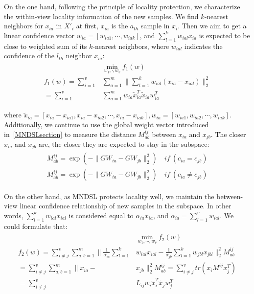 \documentclass[journal]{IEEEtran}
\begin{document}
On the one hand, following the principle of locality protection, we characterize the within-view locality information of the new samples. 
We find $k$-nearest neighbors for $x_{ia}$ in $X'_i$ at first, $x_{ia}$ is the $a_{th}$ sample in $x_i$. 
Then we aim to get a linear confidence vector $w_{ia}=[w_{ia1}, \cdots, w_{iak}]$, and $\sum_{l=1}^k w_{ial} x_{ia}$ is expected to be close to weighted sum of its $k$-nearest neighbors, where $w_{ial}$ indicates the confidence of the $l_{th}$ neighbor $x_{ia}$: 
\begin{align}
\begin{split}
& \min_{w_1,\cdot, w_v} f_1(w) \\
f_1(w)=\sum_{i=1}^v& \sum_{a=1}^m \|\sum_{l=1}^k w_{ial}(x_{ia}-x_{ial}) \|_2^2 \\
=\sum_{i=1}^v& \sum_{a=1}^m w_{ia} \tilde{x}_{ia}^T \tilde{x}_{ia}w_{ia}^T 
\label{f_1}
\end{split}
\end{align}

where $\tilde{x}_{ia}=[x_{ia}-x_{ia1}, x_{ia}-x_{ia2}, \cdots, x_{ia}-x_{iak}], w_{ia}=[w_{ia1}, w_{ia2}, \cdots, w_{iak}]$. 
Additionally, we continue to use the global weight vector introduced in~\ref{MNDSLsection} to measure the distance $M_{ab}^{ij}$ between $x_{ia}$ and $x_{jb}$. The closer $x_{ia}$ and $x_{jb}$ are, the closer they are expected to stay in the subspace: 
\begin{align}
\begin{split}
M_{ab}^{ij} = \exp(-{{\|GW_{ia}-GW_{jb}}\|_2^2})\ &if \ (c_{ia} = c_{jb}) \\
M_{ab}^{ij} = \exp(-{{\|GW_{ia}-GW_{jb}}\|_2^2})\ &if \ (c_{ia}\neq c_{jb}) 
\end{split}
\end{align}

On the other hand, as MNDSL protects locality well, we maintain the between-view linear confidence relationship of new samples in the subspace. 
In other words, $\sum_{l=1}^k w_{ial}x_{ial} $ is considered equal to $ \alpha_{ia} x_{ia}$, 
and $\alpha_{ia}=\sum_{l=1}^v w_{ial}$. 
We could formulate that: 
\begin{align}
\begin{split}
&\min_{w_1,\cdots, w_v} f_2(w) \\
f_2(w) = \sum_{i\neq j}^v \sum_{a,b=1}^m \| \frac{1}{\alpha_{ia}} \sum_{l=1}^k& w_{ial}x_{ial}-\frac{1}{\alpha_{jb}}\sum_{l=1}^k w_{jbl}x_{jbl} \|_2^2M_{ab}^{ij} \\
=\sum_{i\neq j}^v \sum_{a,b=1}^m \|x_{ia}-&x_{jb} \|_2^2M_{ab}^{ij} = \sum_{i\neq j}^v tr(x_i M^{ij} x_j^T) \\
=\sum_{i\neq j}^v&L_{ij} w_i\tilde{x}_i^T\tilde{x}_jw_j^T 
\end{split}
\label{f_2}
\end{align}
\end{document}
